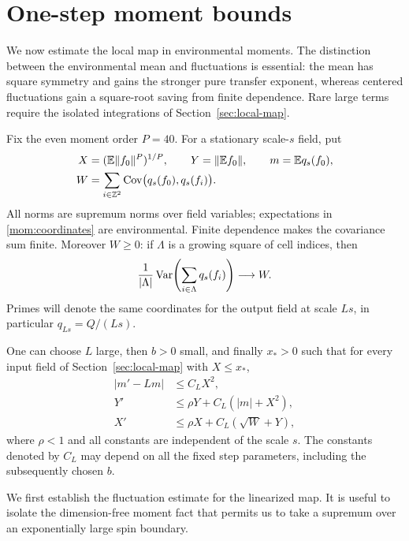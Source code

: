 \section{One-step moment bounds}\label{sec:moments}

We now estimate the local map in environmental moments.  The distinction
between the environmental mean and fluctuations is essential: the mean
has square symmetry and gains the stronger pure transfer exponent,
whereas centered fluctuations gain a square-root saving from finite
dependence.  Rare large terms require the isolated integrations of
Section~\ref{sec:local-map}.

Fix the even moment order $P=40$.  For a stationary scale-$s$ field, put
\begin{equation}\label{mom:coordinates}
 \begin{split}
 X&=(\mathbb E\|f_0\|^P)^{1/P},\qquad
 Y=\|\mathbb E f_0\|,\qquad m=\mathbb E q_s(f_0),\\
 W&=\sum_{i\in\mathbb Z^2}
       \operatorname{Cov}\bigl(q_s(f_0),q_s(f_i)\bigr).
 \end{split}
\end{equation}
All norms are supremum norms over field variables; expectations in
\eqref{mom:coordinates} are environmental.  Finite dependence makes
the covariance sum finite.  Moreover $W\ge0$: if $\Lambda$ is a growing
square of cell indices, then
\[
 \frac1{|\Lambda|}\operatorname{Var}\!\left(\sum_{i\in\Lambda}q_s(f_i)\right)
 \longrightarrow W.
\]
Primes will denote the same coordinates for the output field at scale
$Ls$, in particular $q_{Ls}=Q/(Ls)$.

\begin{proposition}\label{mom:one-step}
One can choose $L$ large, then $b>0$ small, and finally $x_*>0$ such that
for every input field of Section~\ref{sec:local-map} with $X\le x_*$,
\begin{equation}\label{mom:bounds}
 \begin{split}
 |m'-Lm|&\le C_LX^2,\\
 Y'&\le\rho Y+C_L(|m|+X^2),\\
 X'&\le\rho X+C_L(\sqrt W+Y),
 \end{split}
\end{equation}
where $\rho<1$ and all constants are independent of the scale $s$.
The constants denoted by $C_L$ may depend on all the fixed step
parameters, including the subsequently chosen $b$.
\end{proposition}

We first establish the fluctuation estimate for the linearized map.
It is useful to isolate the dimension-free moment fact that permits
us to take a supremum over an exponentially large spin boundary.

